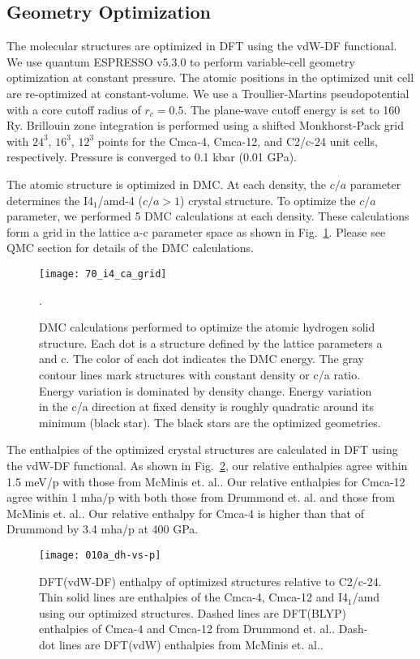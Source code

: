 \subsection{Geometry Optimization}
The molecular structures are optimized in DFT using the vdW-DF functional. We use quantum ESPRESSO v5.3.0 to perform variable-cell geometry optimization at constant pressure. The atomic positions in the optimized unit cell are re-optimized at constant-volume. We use a Troullier-Martins pseudopotential with a core cutoff radius of $r_c=0.5$. The plane-wave cutoff energy is set to 160 Ry. Brillouin zone integration is performed using a shifted Monkhorst-Pack grid with $24^3$, $16^3$, $12^3$ points for the Cmca-4, Cmca-12, and C2/c-24 unit cells, respectively. %
Pressure is converged to 0.1 kbar (0.01 GPa). %

The atomic structure is optimized in DMC. At each density, the $c/a$ parameter determines the I4$_1$/amd-4 ($c/a>1$) crystal structure. To optimize the $c/a$ parameter, we performed 5 DMC calculations at each density. These calculations form a grid in the lattice a-c parameter space as shown in Fig.~\ref{fig:i4-rs-ca}. Please see QMC section for details of the DMC calculations.
\begin{figure}[h]
\texttt{[image: 70\_i4\_ca\_grid]}
\caption{DMC calculations performed to optimize the atomic hydrogen solid structure. Each dot is a structure defined by the lattice parameters a and c. The color of each dot indicates the DMC energy. The gray contour lines mark structures with constant density or c/a ratio. Energy variation is dominated by density change. Energy variation in the c/a direction at fixed density is roughly quadratic around its minimum (black star). The black stars are the optimized geometries.\label{fig:i4-rs-ca}}.
\end{figure}

The enthalpies of the optimized crystal structures are calculated in DFT using the vdW-DF functional. As shown in Fig.~\ref{fig:dft-opt-geo}, our relative enthalpies agree within 1.5 meV/p with those from McMinis et. al.. Our relative enthalpies for Cmca-12 agree within 1 mha/p with both those from Drummond et. al. and those from McMinis et. al.. Our relative enthalpy for Cmca-4 is higher than that of Drummond by 3.4 mha/p at 400 GPa. %
\begin{figure}[h]
\texttt{[image: 010a\_dh-vs-p]}
\caption{DFT(vdW-DF) enthalpy of optimized structures relative to C2/c-24. Thin solid lines are enthalpies of the Cmca-4, Cmca-12 and I4$_1$/amd using our optimized structures. Dashed lines are DFT(BLYP) enthalpies of Cmca-4 and Cmca-12 from Drummond et. al.. Dash-dot lines are DFT(vdW) enthalpies from McMinis et. al..\label{fig:dft-opt-geo}}
\end{figure}
